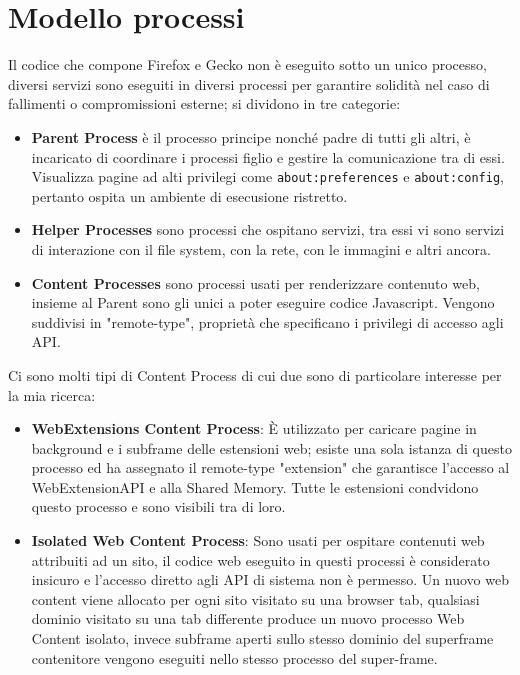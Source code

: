 \documentclass{sapthesis}
\newcommand{\code}[1]{\texttt{#1}}
\begin{document}
    \section{Modello processi}
    \label{sec:modello-processi}
        Il codice che compone Firefox e Gecko non è eseguito sotto un unico processo, diversi servizi
        sono eseguiti in diversi processi per garantire solidità nel caso di fallimenti o 
        compromissioni esterne; si dividono in tre categorie:
        \begin{itemize}
            \item \textbf{Parent Process} è il processo principe nonché padre di tutti gli altri,
                è incaricato di coordinare i processi figlio e gestire la comunicazione tra di essi.
                Visualizza pagine ad alti privilegi come \code{about:preferences} e \code{about:config},
                pertanto ospita un ambiente di esecusione ristretto.

            \item \textbf{Helper Processes} sono processi che ospitano servizi, tra essi vi sono servizi
                di interazione con il file system, con la rete, con le immagini e altri ancora.

            \item \textbf{Content Processes} sono processi usati per renderizzare contenuto web, insieme
                al Parent sono gli unici a poter eseguire codice Javascript. Vengono suddivisi in 
                "remote-type", proprietà che specificano i privilegi di accesso agli API.

        \end{itemize}
        Ci sono molti tipi di Content Process di cui due sono di particolare interesse per la mia ricerca:
        \begin{itemize}
            \item \textbf{WebExtensions Content Process}: È utilizzato per caricare pagine
                in background e i subframe delle estensioni web; esiste una sola istanza di
                questo processo ed ha assegnato il remote-type "extension" che garantisce 
                l'accesso al WebExtensionAPI e alla Shared Memory. Tutte le estensioni condvidono
                questo processo e sono visibili tra di loro.

            \item \textbf{Isolated Web Content Process}: Sono usati per ospitare contenuti web attribuiti ad un sito,
                il codice web eseguito in questi processi è considerato insicuro e l'accesso diretto agli
                API di sistema non è permesso. Un nuovo web content viene allocato per ogni sito visitato su
                una browser tab, qualsiasi dominio visitato su una tab differente produce un nuovo processo
                Web Content isolato, invece subframe aperti sullo stesso dominio del superframe contenitore
                vengono eseguiti nello stesso processo del super-frame.
        \end{itemize}
\end{document}
